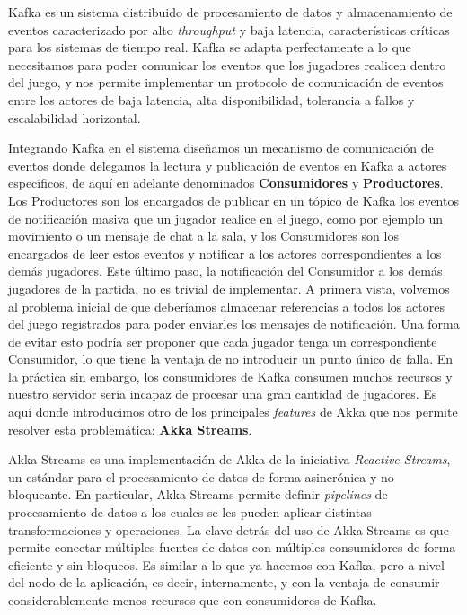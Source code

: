 Kafka es un sistema distribuido de procesamiento de datos y almacenamiento de eventos caracterizado
por alto \textit{throughput} y baja latencia, características críticas para los sistemas de tiempo real.
Kafka se adapta perfectamente a lo que necesitamos para poder comunicar los eventos que los jugadores
realicen dentro del juego, y nos permite implementar un protocolo de comunicación de eventos entre los actores
de baja latencia, alta disponibilidad, tolerancia a fallos y escalabilidad horizontal.

Integrando Kafka en el sistema diseñamos un mecanismo de comunicación de eventos donde delegamos la lectura
y publicación de eventos en Kafka a actores específicos, de aquí en adelante denominados \textbf{Consumidores}
y \textbf{Productores}. Los Productores son los encargados de publicar en un tópico de Kafka los eventos de notificación masiva
que un jugador realice en el juego, como por ejemplo un movimiento o un mensaje de chat a la sala, y los Consumidores
son los encargados de leer estos eventos y notificar a los actores correspondientes a los demás jugadores.
Este último paso, la notificación del Consumidor a los demás jugadores de la partida, no es trivial de implementar.
A primera vista, volvemos al problema inicial de que deberíamos almacenar referencias a todos los actores del juego registrados
para poder enviarles los mensajes de notificación. Una forma de evitar esto podría ser proponer que cada jugador tenga un correspondiente
Consumidor, lo que tiene la ventaja de no introducir un punto único de falla. En la práctica sin embargo, los consumidores de Kafka consumen muchos recursos y
nuestro servidor sería incapaz de procesar una gran cantidad de jugadores.
Es aquí donde introducimos otro de los principales \textit{features} de Akka que nos permite resolver esta problemática:
\textbf{Akka Streams}.

Akka Streams es una implementación de Akka de la iniciativa \textit{Reactive Streams}, un estándar para el procesamiento de datos de forma asincrónica y no bloqueante.
En particular, Akka Streams permite definir \textit{pipelines} de procesamiento de datos a los cuales se les pueden aplicar distintas transformaciones y operaciones.
La clave detrás del uso de Akka Streams es que permite conectar múltiples fuentes de datos con múltiples consumidores de forma eficiente y sin bloqueos. Es similar a
lo que ya hacemos con Kafka, pero a nivel del nodo de la aplicación, es decir, internamente, y con la ventaja de consumir considerablemente menos recursos que con
consumidores de Kafka.

